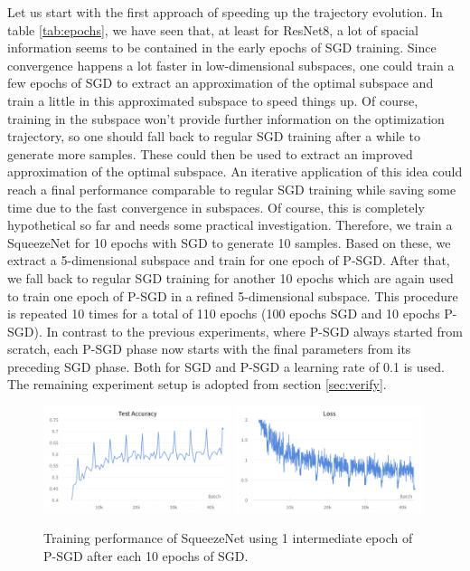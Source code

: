 \documentclass[11pt, a4paper]{article}
\begin{document}
Let us start with the first approach of speeding up the trajectory evolution. In table \ref{tab:epochs}, we have seen that, at least for ResNet8, a lot of spacial information seems to be contained in the early epochs of SGD training. Since convergence happens a lot faster in low-dimensional subspaces, one could train a few epochs of SGD to extract an approximation of the optimal subspace and train a little in this approximated subspace to speed things up. Of course, training in the subspace won't provide further information on the optimization trajectory, so one should fall back to regular SGD training after a while to generate more samples. These could then be used to extract an improved approximation of the optimal subspace. An iterative application of this idea could reach a final performance comparable to regular SGD training while saving some time due to the fast convergence in subspaces. Of course, this is completely hypothetical so far and needs some practical investigation. 
Therefore, we train a SqueezeNet for 10 epochs with SGD to generate 10 samples. Based on these, we extract a 5-dimensional subspace and train for one epoch of P-SGD. After that, we fall back to regular SGD training for another 10 epochs which are again used to train one epoch of P-SGD in a refined 5-dimensional subspace. This procedure is repeated 10 times for a total of 110 epochs (100 epochs SGD and 10 epochs P-SGD). In contrast to the previous experiments, where P-SGD always started from scratch, each P-SGD phase now starts with the final parameters from its preceding SGD phase. Both for SGD and P-SGD a learning rate of 0.1 is used. The remaining experiment setup is adopted from section \ref{sec:verify}. \\

\begin{figure}[!h]
\centering
{\includegraphics[width=0.49\textwidth]{images/exp5-accuracy.png}}
{\includegraphics[width=0.49\textwidth]{images/exp5-loss.png}}
\parbox{12cm}{\centering \caption{\centering Training performance of SqueezeNet using 1 intermediate epoch of P-SGD after each 10 epochs of SGD. \label{fig:refinement}}}
\end{figure}
\end{document}
